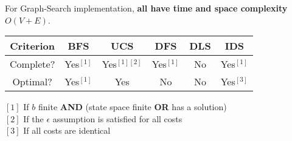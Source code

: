 \documentclass[10pt,landscape,letterpaper]{article}
\begin{document}
\begin{multicols}{3}
For Graph-Search implementation, \textbf{all have time and space complexity $O(V+E)$}.
\begin{center}
\begin{tabular}{||c || c | c | c | c | c||} 
 \hline 
 Criterion  & BFS           & UCS           & DFS           & DLS       & IDS           \\
 \hline \hline
 Complete?  & Yes$^{[1]}$   & Yes$^{[1][2]}$& Yes$^{[1]}$   & No        & Yes$^{[1]}$  \\
 \hline
 Optimal?   & Yes$^{[1]}$   & Yes           & No            & No        & Yes$^{[3]}$   \\
 \hline
\end{tabular}
\end{center}
$[1]$ If $b$ finite \textbf{AND} (state space finite \textbf{OR} has a solution) \\
$[2]$ If the $\epsilon$ assumption is satisfied for all costs \\
$[3]$ If all costs are identical


\end{multicols}
\end{document}
